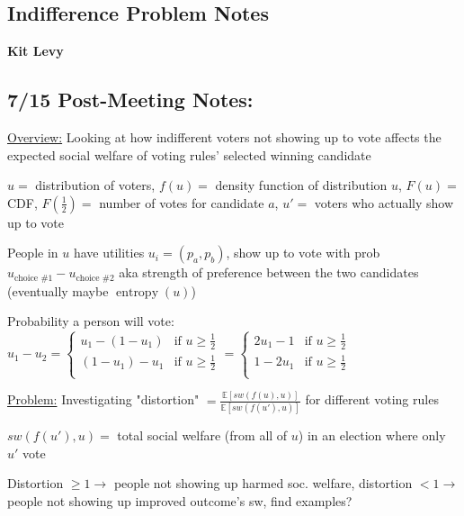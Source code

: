 \documentclass[12pt]{article}
\begin{document}
\setlength{\parindent}{0pt}
\setlength{\parskip}{2pt plus1pt}
\setlength{\baselineskip}{10pt plus1pt}

\subsection*{Indifference Problem Notes}
\textbf{Kit Levy}

\subsection*{7/15 Post-Meeting Notes:}

\underline{Overview:} Looking at how indifferent voters not showing up to vote affects the expected social welfare of voting rules' selected winning candidate
\newline

$u =$ distribution of voters, $f(u) =$ density function of distribution $u$, $F(u) =$ CDF, $F(\frac{1}{2}) =$ number of votes for candidate $a$, $u' =$  voters who actually show up to vote

People in $u$ have utilities $u_i = (p_a, p_b)$, show up to vote with prob $u_{\text{choice \#}1} - u_{\text{choice \#}2}$ aka strength of preference between the two candidates (eventually maybe $\operatorname{entropy}(u)$)

Probability a person will vote: $u_1 - u_2 = \begin{cases} 
u_1 - (1-u_1) & \text{if } u \geq \frac{1}{2} \\
(1 - u_1) - u_1 & \text{if } u \geq \frac{1}{2}\\
\end{cases} = \begin{cases} 
2u_1 - 1 & \text{if } u \geq \frac{1}{2} \\
1 - 2u_1 & \text{if } u \geq \frac{1}{2}\\
\end{cases}$
\newline \newline

\underline{Problem:} Investigating "distortion" $ = \frac{\mathbb{E}[sw(f(u), u)]}{\mathbb{E}[sw(f(u'), u)]}$ for different voting rules

$sw(f(u'), u) =$ total social welfare (from all of $u$) in an election where only $u'$ vote

Distortion $\geq 1 \rightarrow$ people not showing up harmed soc. welfare, distortion $< 1 \rightarrow$ people not showing up improved outcome's sw, find examples?
\end{document}
